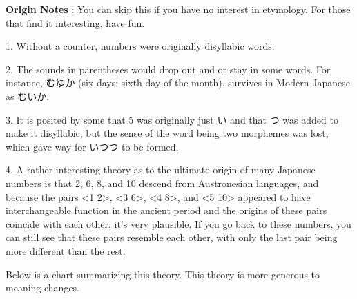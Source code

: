 \par{\textbf{Origin Notes }: You can skip this if you have no interest in etymology. For those that find it interesting, have fun. }

\par{1. Without a counter, numbers were originally disyllabic words. }

\par{2. The sounds in parentheses would drop out and or stay in some words. For instance, むゆか (six days; sixth day of the month), survives in Modern Japanese as むいか. }

\par{3. It is posited by some that 5 was originally just い and that つ was added to make it disyllabic, but the sense of the word being two morphemes was lost, which gave way for いつつ to be formed. }

\par{4. A rather interesting theory as to the ultimate origin of many Japanese numbers is that 2, 6, 8, and 10 descend from Austronesian languages, and because the pairs <1 2>, <3 6>, <4 8>, and <5 10> appeared to have interchangeable function in the ancient period and the origins of these pairs coincide with each other, it's very plausible. If you go back to these numbers, you can still see that these pairs resemble each other, with only the last pair being more different than the rest. }

\par{ Below is a chart summarizing this theory. This theory is more generous to meaning changes. }

